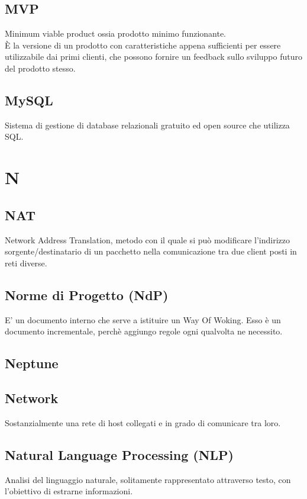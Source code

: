 \documentclass{classes/base}
\begin{document}
        \subsection*{MVP}
        Minimum viable product ossia prodotto minimo funzionante. \\
        È la versione di un prodotto con caratteristiche appena sufficienti per essere utilizzabile dai primi clienti, che possono fornire un feedback sullo sviluppo futuro del prodotto stesso.

        \subsection*{MySQL}
        Sistema di gestione di database relazionali gratuito ed open source che utilizza SQL.
        \newpage  
    \section{N}
        \subsection*{NAT}
        Network Address Translation, metodo con il quale si può modificare l'indirizzo sorgente/destinatario di un pacchetto nella comunicazione tra due client posti in reti diverse.

        \subsection*{Norme di Progetto (NdP)} 
        E' un documento interno che serve a istituire un Way Of Woking. Esso è un documento incrementale, perchè aggiungo regole ogni qualvolta ne necessito.
        
        \subsection*{Neptune}

        \subsection*{Network}
        Sostanzialmente una rete di host collegati e in grado di comunicare tra loro.

        \subsection*{Natural Language Processing (NLP)}
        Analisi del linguaggio naturale, solitamente rappresentato attraverso testo, con l'obiettivo di estrarne informazioni.
\end{document}
